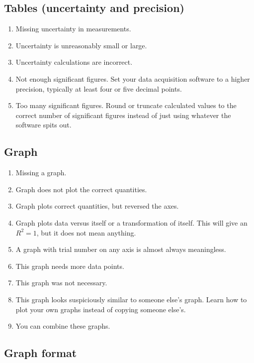 \documentclass[12pt,letterpaper]{article}
\begin{document}
\begin{multicols}{2}
\subsection*{Tables (uncertainty and precision)}

\begin{enumerate}[start=70]
  \item Missing uncertainty in measurements.
  \item Uncertainty is unreasonably small or large.
  \item Uncertainty calculations are incorrect.
  \item Not enough significant figures.
    Set your data acquisition software to a higher precision,
    typically at least four or five decimal points.
  \item Too many significant figures.  Round or truncate calculated values
    to the correct number of significant figures
    instead of just using whatever the software spits out.
\end{enumerate}

\subsection*{Graph}

\begin{enumerate}[start=80]
  \item Missing a graph.
  \item Graph does not plot the correct quantities.
  \item Graph plots correct quantities, but reversed the axes.
  \item Graph plots data versus itself or a transformation of itself.
    This will give an $R^2 = 1$, but it does not mean anything.
  \item A graph with trial number on any axis
    is almost always meaningless.
  \item This graph needs more data points.
  \item This graph was not necessary.
  \item This graph looks suspiciously similar to someone else's graph.
    Learn how to plot your own graphs instead of copying someone else's.
  \item You can combine these graphs.
\end{enumerate}

\subsection*{Graph format}


\end{multicols}
\end{document}
